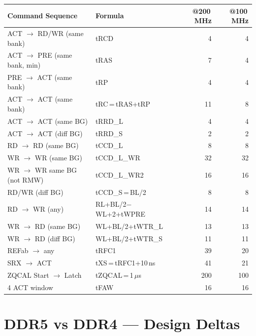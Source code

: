 \documentclass[10pt,a4paper]{article}
\newcommand{\Th}[1]{\cellcolor{thbg}\textbf{\small\color{acc1}#1}}
\newcommand{\RA}{\rowcolor{white}}
\newcommand{\RB}{\rowcolor{altbg}}
\begin{document}
\begin{center}
\begin{tabularx}{\linewidth}{@{} l l r r @{}}
\toprule
\Th{Command Sequence} & \Th{Formula} & \Th{@200\,MHz} & \Th{@100\,MHz} \\
\midrule
\RA ACT $\to$ RD/WR (same bank) & tRCD & 4 & 4 \\
\RB ACT $\to$ PRE (same bank, min) & tRAS & 7 & 4 \\
\RA PRE $\to$ ACT (same bank) & tRP & 4 & 4 \\
\RB ACT $\to$ ACT (same bank) & tRC\,=\,tRAS+tRP & 11 & 8 \\
\RA ACT $\to$ ACT (same BG) & tRRD\_L & 4 & 4 \\
\RB ACT $\to$ ACT (diff BG) & tRRD\_S & 2 & 2 \\
\RA RD $\to$ RD (same BG) & tCCD\_L & 8 & 8 \\
\RB WR $\to$ WR (same BG) & tCCD\_L\_WR & 32 & 32 \\
\RA WR $\to$ WR same BG (not RMW) & tCCD\_L\_WR2 & 16 & 16 \\
\RB RD/WR (diff BG) & tCCD\_S\,=\,BL/2 & 8 & 8 \\
\RA RD $\to$ WR (any) & RL+BL/2$-$WL+2+tWPRE & 14 & 14 \\
\RB WR $\to$ RD (same BG) & WL+BL/2+tWTR\_L & 13 & 13 \\
\RA WR $\to$ RD (diff BG) & WL+BL/2+tWTR\_S & 11 & 11 \\
\RB REFab $\to$ any & tRFC1 & 39 & 20 \\
\RA SRX $\to$ ACT & tXS\,=\,tRFC1+10\,ns & 41 & 21 \\
\RB ZQCAL Start $\to$ Latch & tZQCAL\,=\,1\,$\mu$s & 200 & 100 \\
\RA 4 ACT window & tFAW & 16 & 16 \\
\bottomrule
\end{tabularx}
\end{center}

\section{DDR5 vs DDR4 --- Design Deltas}
\end{document}
